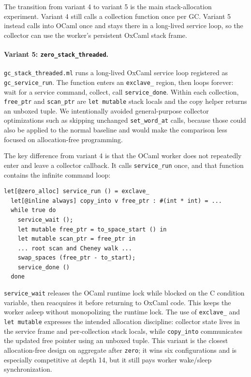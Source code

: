 \documentclass[11pt,a4paper]{article}
\begin{document}
The transition from variant 4 to variant 5 is the main stack-allocation
experiment.  Variant 4 still calls a collection function once per GC.  Variant
5 instead calls into OCaml once and stays there in a long-lived service loop,
so the collector can use the worker's persistent OxCaml stack frame.

\paragraph{Variant 5: \texttt{zero\_stack\_threaded}.}
\texttt{gc\_stack\_threaded.ml} runs a long-lived OxCaml service loop registered
as \texttt{gc\_service\_run}.  The function enters an \texttt{exclave\_} region,
then loops forever: wait for a service command, collect, call
\texttt{service\_done}.  Within each collection, \texttt{free\_ptr} and
\texttt{scan\_ptr} are \texttt{let mutable} stack locals and the copy helper
returns an unboxed tuple.  We intentionally avoided general-purpose collector
optimizations such as skipping unchanged \texttt{set\_word\_at} calls, because
those could also be applied to the normal baseline and would make the comparison
less focused on allocation-free programming.

The key difference from variant 4 is that the OCaml worker does not repeatedly
enter and leave a collector callback.  It calls \texttt{service\_run} once, and
that function contains the infinite command loop:
\begin{lstlisting}[caption={Shape of the stack-threaded service loop.},label={lst:service}]
let[@zero_alloc] service_run () = exclave_
  let[@inline always] copy_into v free_ptr : #(int * int) = ...
  while true do
    service_wait ();
    let mutable free_ptr = to_space_start () in
    let mutable scan_ptr = free_ptr in
    ... root scan and Cheney walk ...
    swap_spaces (free_ptr - to_start);
    service_done ()
  done
\end{lstlisting}

\texttt{service\_wait} releases the OCaml runtime lock while blocked on the C
condition variable, then reacquires it before returning to OxCaml code.  This
keeps the worker asleep without monopolizing the runtime lock.  The use of
\texttt{exclave\_} and \texttt{let mutable} expresses the intended allocation
discipline: collector state lives in the service frame and per-collection stack
locals, while \texttt{copy\_into} communicates the updated free pointer using an
unboxed tuple.  This variant is the closest allocation-free design on aggregate
after \texttt{zero}; it wins six configurations and is especially competitive
at depth 14, but it still pays worker wake/sleep synchronization.
\end{document}

